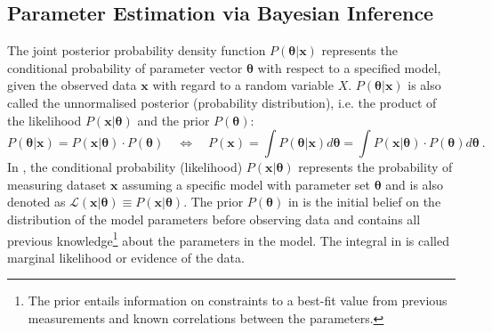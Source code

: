 \subsection{Parameter Estimation via Bayesian Inference} %
\label{sec:bayesian_inference} %
The joint posterior  
probability density function $P(\boldsymbol{\theta}|\boldsymbol{x})$ represents the conditional probability of parameter vector $\boldsymbol{\theta}$ with respect to a specified model, given the observed data $\boldsymbol{x}$ with regard to a random variable $X$. $P(\boldsymbol{\theta}|\boldsymbol{x})$ is also called the unnormalised posterior (probability distribution), i.e. the product of the likelihood $P(\boldsymbol{x}|\boldsymbol{\theta})$ and the prior $P(\boldsymbol{\theta})$:
%
\begin{equation} \label{eq:unnormalised_posterior}
 P(\boldsymbol{\theta}|\boldsymbol{x}) = P(\boldsymbol{x}|\boldsymbol{\theta}) \cdot P(\boldsymbol{\theta})
 \quad 
 \Longleftrightarrow 
 \quad 
 P(\boldsymbol{x}) 
 = 
 \int P(\boldsymbol{\theta}|\boldsymbol{x}) d\boldsymbol{\theta}
 =
 \int P(\boldsymbol{x}|\boldsymbol{\theta}) \cdot P(\boldsymbol{\theta}) d\boldsymbol{\theta}
 \ .
\end{equation}  
%
In , the conditional probability (likelihood) $P(\boldsymbol{x}|\boldsymbol{\theta})$ represents the probability of measuring dataset $\boldsymbol{x}$ assuming a specific model with parameter set $\boldsymbol{\theta}$ and is also denoted as $\mathcal{L}(\boldsymbol{x}|\boldsymbol{\theta}) \equiv P(\boldsymbol{x}|\boldsymbol{\theta})$. The prior $P(\boldsymbol{\theta})$ in  is the initial belief on the distribution of the model parameters before observing data and contains all previous knowledge\footnote{The prior entails information on constraints to a best-fit value from previous measurements and known correlations between the parameters.} about the parameters in the model. The integral in  is called marginal likelihood or evidence of the data.
